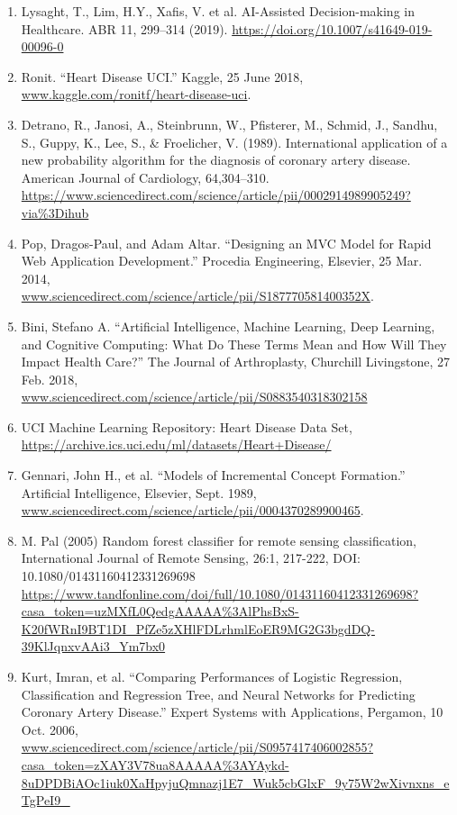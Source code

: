 \documentclass[12pt]{article}
\begin{document}
\begin{enumerate}
    \item Lysaght, T., Lim, H.Y., Xafis, V. et al. AI-Assisted Decision-making in Healthcare. ABR 11, 299–314 (2019). \url{https://doi.org/10.1007/s41649-019-00096-0}
    \item Ronit. “Heart Disease UCI.” Kaggle, 25 June 2018, \\ \url{www.kaggle.com/ronitf/heart-disease-uci}.
    \item Detrano, R., Janosi, A., Steinbrunn, W., Pfisterer, M., 
    Schmid, J., Sandhu, S., Guppy, K., Lee, S., \& Froelicher, V. 
    (1989). International application of a new probability algorithm 
    for the diagnosis of coronary artery disease. American Journal of 
    Cardiology, 64,304--310. \\ \url{https://www.sciencedirect.com/science/article/pii/0002914989905249?via%3Dihub}
    \item Pop, Dragos-Paul, and Adam Altar. “Designing an MVC Model for Rapid Web Application Development.” Procedia Engineering, Elsevier, 25 Mar. 2014, \\ \url{www.sciencedirect.com/science/article/pii/S187770581400352X}.
    \item Bini, Stefano A. “Artificial Intelligence, Machine Learning, Deep Learning, and Cognitive Computing: What Do These Terms Mean and How Will They Impact Health Care?” The Journal of Arthroplasty, Churchill Livingstone, 27 Feb. 2018, \\ \url{www.sciencedirect.com/science/article/pii/S0883540318302158}
    \item UCI Machine Learning Repository: Heart Disease Data Set, \\ \url{https://archive.ics.uci.edu/ml/datasets/Heart+Disease/}
    \item Gennari, John H., et al. “Models of Incremental Concept Formation.” Artificial Intelligence, Elsevier, Sept. 1989, \\ \url{www.sciencedirect.com/science/article/pii/0004370289900465}.
    \item M. Pal (2005) Random forest classifier for remote sensing classification, International Journal of Remote Sensing, 26:1, 217-222, DOI: 10.1080/01431160412331269698 \\
    \url{https://www.tandfonline.com/doi/full/10.1080/01431160412331269698?casa_token=uzMXfL0QedgAAAAA%3AlPhsBxS-K20fWRnI9BT1DI_PfZe5zXHlFDLrhmlEoER9MG2G3bgdDQ-39KlJqnxvAAi3_Ym7bx0}
    \item Kurt, Imran, et al. “Comparing Performances of Logistic Regression, Classification and Regression Tree, and Neural Networks for Predicting Coronary Artery Disease.” Expert Systems with Applications, Pergamon, 10 Oct. 2006, \\ \url{www.sciencedirect.com/science/article/pii/S0957417406002855?casa_token=zXAY3V78ua8AAAAA%3AYAykd-8uDPDBiAOc1iuk0XaHpyjuQmnazj1E7_Wuk5cbGlxF_9y75W2wXivnxns_eTgPeI9_}

\end{enumerate}
\end{document}
